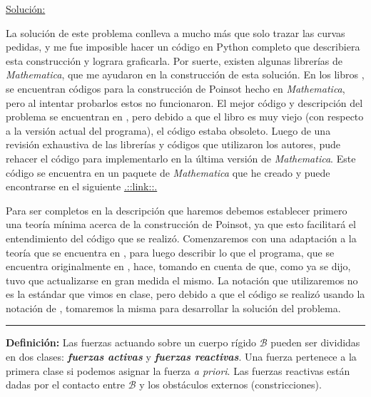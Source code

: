 \documentclass[a4paper,10pt]{article}
\numberwithin{equation}{section}
\newcommand{\definicion}{\textbf{Definición: }}
\begin{document}
\underline{Solución:} \vspace{.3cm}

La solución de este problema conlleva a mucho más que solo trazar las curvas pedidas,
y me fue imposible hacer un código en Python completo que describiera esta construcción y
lograra graficarla. Por suerte, existen algunas librerías de \emph{Mathematica}, que me 
ayudaron en la construcción de esta solución. En los libros \cite{marasco,romano}, se 
encuentran códigos para la construcción de Poinsot hecho en \emph{Mathematica}, pero
al intentar probarlos estos no funcionaron. El mejor código y descripción del problema
se encuentran en \cite{marasco}, pero debido a que el libro es muy viejo (con respecto
a la versión actual del programa), el código estaba obsoleto. Luego de una revisión 
exhaustiva de las librerías y códigos que utilizaron los autores, pude rehacer el 
código para implementarlo en la última versión de \emph{Mathematica}. Este código 
se encuentra en un paquete de \emph{Mathematica} que he creado y puede encontrarse en el siguiente 
\href{https://github.com/FavioVazquez/MecanicaClasica-PCF/blob/master/Tarea4/Poinsot.m}{\color{blue}.::link::.}

\vspace{.3cm}

Para ser completos en la descripción que haremos debemos establecer primero una teoría 
mínima acerca de la construcción de Poinsot, ya que esto facilitará el entendimiento 
del código que se realizó. Comenzaremos con una adaptación a la teoría que se encuentra 
en \cite{romano}, para luego describir lo que el programa, que se encuentra originalmente 
en \cite{marasco}, hace, tomando en cuenta de que, como ya se dijo, tuvo que actualizarse 
en gran medida el mismo. La notación que utilizaremos no es la estándar que vimos en 
clase, pero debido a que el código se realizó usando la notación de \cite{marasco,romano},
tomaremos la misma para desarrollar la solución del problema.

\vspace{.3cm}

\noindent\rule[0.5ex]{\linewidth}{1pt}

\vspace{.3cm}

\definicion Las fuerzas actuando sobre un cuerpo rígido $\mathcal{B}$ pueden ser divididas 
en dos clases: \textbf{\emph{fuerzas activas}} y \textbf{\emph{fuerzas reactivas}}. Una 
fuerza pertenece a la primera clase si podemos asignar la fuerza \emph{a priori}. Las fuerzas 
reactivas están dadas por el contacto entre $\mathcal{B}$ y los obstáculos externos (constricciones). 
\end{document}
